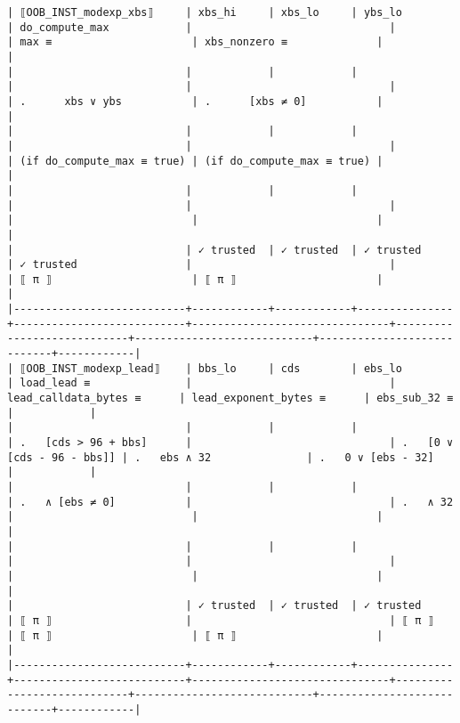 \documentclass[varwidth=\maxdimen,margin=0.5cm,multi={verbatim}]{standalone}
\begin{document}
\begin{verbatim}
| ⟦OOB_INST_modexp_xbs⟧     | xbs_hi     | xbs_lo     | ybs_lo        | do_compute_max            |                               |                            | max ≡                      | xbs_nonzero ≡              |            |
|                           |            |            |               |                           |                               |                            | .      xbs ∨ ybs           | .      [xbs ≠ 0]           |            |
|                           |            |            |               |                           |                               |                            | (if do_compute_max ≡ true) | (if do_compute_max ≡ true) |            |
|                           |            |            |               |                           |                               |                            |                            |                            |            |
|                           | ✓ trusted  | ✓ trusted  | ✓ trusted     | ✓ trusted                 |                               |                            | ⟦ π ⟧                      | ⟦ π ⟧                      |            |
|---------------------------+------------+------------+---------------+---------------------------+-------------------------------+----------------------------+----------------------------+----------------------------+------------|
| ⟦OOB_INST_modexp_lead⟧    | bbs_lo     | cds        | ebs_lo        | load_lead ≡               |                               | lead_calldata_bytes ≡      | lead_exponent_bytes ≡      | ebs_sub_32 ≡               |            |
|                           |            |            |               | .   [cds > 96 + bbs]      |                               | .   [0 ∨ [cds - 96 - bbs]] | .   ebs ∧ 32               | .   0 ∨ [ebs - 32]         |            |
|                           |            |            |               | .   ∧ [ebs ≠ 0]           |                               | .   ∧ 32                   |                            |                            |            |
|                           |            |            |               |                           |                               |                            |                            |                            |            |
|                           | ✓ trusted  | ✓ trusted  | ✓ trusted     | ⟦ π ⟧                     |                               | ⟦ π ⟧                      | ⟦ π ⟧                      | ⟦ π ⟧                      |            |
|---------------------------+------------+------------+---------------+---------------------------+-------------------------------+----------------------------+----------------------------+----------------------------+------------|

\end{verbatim}
\end{document}
